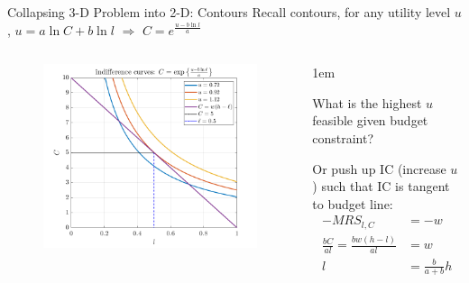 \documentclass[11pt,aspectratio=43]{beamer}
\let\olditemize=\itemize
\let\endolditemize=\enditemize
\renewenvironment{itemize}{\olditemize \itemsep1em}{\endolditemize}
\theoremstyle{definition}
\begin{document}
\begin{frame}{Collapsing 3-D Problem into 2-D: Contours}
\label{slide:Collapsing_3_D_Problem_into_2_D__Contours}
Recall \alert{contours}, for any utility level $ u $, $ u = a \ln C + b \ln l $ $ \Rightarrow  $ $ C = e^{ \frac{u - b \ln l}{a}} $
\begin{columns}
    \begin{column}{0.6\textwidth}
        \begin{figure}
            \includegraphics[width=\textwidth]{./figures/UtilityBudget2DContour.png}
        \end{figure}
    \end{column}
    \begin{column}{0.4\textwidth}
        \begin{itemize}
            \item \alert{What is the highest $ u $ feasible given budget constraint}?
            \item Or push up IC (increase $ u $) such that IC is tangent to budget line:
                \begin{align*}
                   - MRS_{l, C}
                       & = -w
                   \\
                    \frac{b C}{a l} = \frac{b w ( h-l )}{a l}
                        & = w
                    \\
                    l
                        & = \frac{b}{a+b}h
                    \\
                \end{align*}
        \end{itemize}
    \end{column}
\end{columns}

\end{frame}
\end{document}
